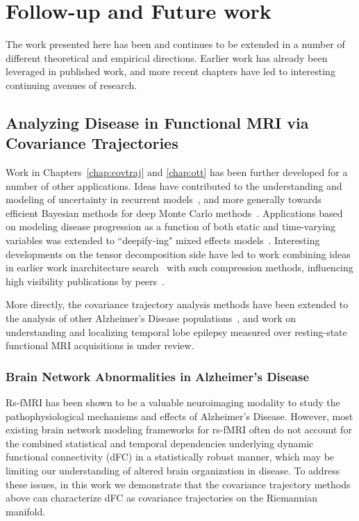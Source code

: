 \chapter{Follow-up and Future work}\label{chap:discuss}

The work presented here has been and continues 
to be extended in a number of different theoretical 
and empirical directions.
Earlier work has already been leveraged in published work,
and more recent chapters
have led to interesting
continuing avenues of research.

\section{Analyzing Disease in Functional MRI via Covariance Trajectories}

Work in Chapters~\ref{chap:covtraj} and \ref{chap:ott} has been further developed for a number of other applications.
Ideas have contributed
to the understanding and modeling of uncertainty
in recurrent models~\citep{spgru},
and more generally towards efficient
Bayesian methods for deep Monte Carlo methods~\citep{mcreparam}.
Applications based on modeling disease progression
as a function of both static and time-varying 
variables was extended to ``deepify-ing" mixed effects models~\citep{deepmem}.
Interesting developments on the tensor decomposition side
have led to work combining ideas
in earlier work inarchitecture search~\citep{submodarch}
with such compression methods,
influencing high visibility publications by peers~\citep{xiong2021mobiledets}.

More directly, the covariance trajectory analysis
methods have been extended 
to the analysis of other Alzheimer's Disease populations~\citep{isbi},
and work on understanding and localizing temporal lobe epilepsy
measured over resting-state functional MRI acquisitions is under review.

\subsection{Brain Network Abnormalities in Alzheimer's Disease}
Rs-fMRI has been shown to be a valuable neuroimaging modality to study the pathophysiological mechanisms and effects of Alzheimer's Disease. 
However, most existing brain network modeling frameworks for rs-fMRI often do not account for the combined statistical and temporal dependencies underlying dynamic functional connectivity (dFC) in a statistically robust manner, 
which may be limiting our understanding of altered brain organization in disease.
To address these issues, in this work we demonstrate that
the covariance trajectory methods above can characterize dFC as covariance trajectories on the Riemannian manifold.

